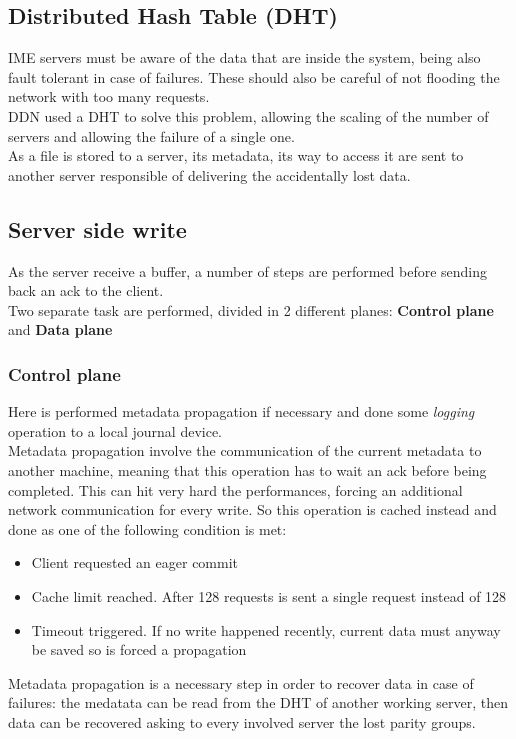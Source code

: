 \subsection{Distributed Hash Table (DHT)}
IME servers must be aware of the data that are inside the system, being also
fault tolerant in case of failures. These should also be careful of not flooding
the network with too many requests. \\
DDN used a DHT to solve this problem, allowing the scaling of the number of
servers and allowing the failure of a single one. \\
As a file is stored to a server, its metadata, its way to access it are sent to
another server responsible of delivering the accidentally lost data.

\subsection{Server side write}
As the server receive a buffer, a number of steps are performed before sending
back an ack to the client. \\ Two separate task are performed, divided in 2
different planes: \textbf{Control plane} and \textbf{Data plane}

\subsubsection*{Control plane}
Here is performed metadata propagation if necessary and done some
\textit{logging} operation to a local journal device. \\ Metadata propagation
involve the communication of the current metadata to another machine, meaning
that this operation has to wait an ack before being completed.  This can hit
very hard the performances, forcing an additional network communication for
every write. So this operation is cached instead and done as one of the
following condition is met:
\begin{itemize}
    \item Client requested an eager commit
    \item Cache limit reached. After 128 requests is sent a single request
        instead of 128
    \item Timeout triggered. If no write happened recently, current
        data must anyway be saved so is forced a propagation
\end{itemize}
Metadata propagation is a necessary step in order to recover data in case of
failures: the medatata can be read from the DHT of another working server, then
data can be recovered asking to every involved server the lost parity groups.

